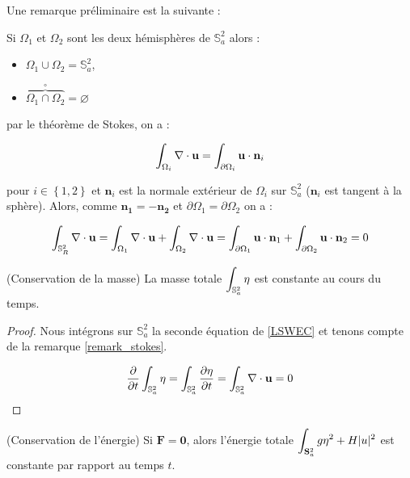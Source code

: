 \begin{remarque}
\label{remark_stokes}
Une remarque préliminaire est la suivante  :

Si $\Omega_1$ et $\Omega_2$ sont les deux hémisphères de $\mathbb{S}^2_a$ alors :
\begin{itemize}
\item $\Omega_1 \cup \Omega_2 = \mathbb{S}^2_a $,
\item $\overbrace{\Omega_1 \cap \Omega_2}^{\circ} = \varnothing$
\end{itemize}

par le théorème de Stokes, on a :

\begin{equation}
\displaystyle\int_{\Omega_i}  \nabla \cdot \mathbf{u} = \displaystyle\int_{\partial \Omega_i} \mathbf{u} \cdot \mathbf{n}_i
\end{equation}

pour $i \in \left\lbrace 1, 2 \right\rbrace$ et $\mathbf{n}_i$ est la normale extérieur de $\Omega_i$ sur $\mathbb{S}_a^2$ ($\mathbf{n}_i$ est tangent à la sphère).
Alors, comme $\mathbf{n_1} = -\mathbf{n_2}$ et $\partial \Omega_1 = \partial \Omega_2$ on a :

$$\displaystyle\int_{\mathbb{S}_R^2}  \nabla \cdot \mathbf{u} = \displaystyle\int_{\Omega_1}  \nabla \cdot \mathbf{u} + \displaystyle\int_{\Omega_2}  \nabla \cdot \mathbf{u} = \displaystyle\int_{\partial \Omega_1} \mathbf{u} \cdot \mathbf{n}_1 + \displaystyle\int_{\partial \Omega_2} \mathbf{u} \cdot \mathbf{n}_2 = 0$$
\end{remarque}

\begin{proposition}
(Conservation de la masse)
La masse totale $\displaystyle\int_{\mathbb{S}_a^2} \eta$ est constante au cours du temps.
\end{proposition}

\begin{proof}
Nous intégrons sur $\mathbb{S}_a^2$ la seconde équation de \eqref{LSWEC} et tenons compte de la remarque \ref{remark_stokes}.

$$\dfrac{\partial}{\partial t} \displaystyle\int_{\mathbb{S}_a^2} \eta = \displaystyle\int_{\mathbb{S}_a^2} \dfrac{\partial \eta}{\partial t} = \displaystyle\int_{\mathbb{S}_a^2} \nabla \cdot \mathbf{u} = 0$$
\end{proof}

\begin{proposition}
(Conservation de l'énergie)
Si $\mathbf{F} = \mathbf{0}$, alors l'énergie totale $\displaystyle\int_{\mathbf{S}_a^2 }g  \eta^2 + H | u |^2$ est constante par rapport au temps $t$.
\end{proposition}

